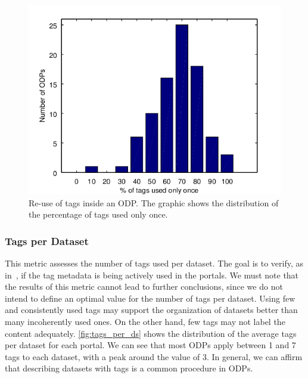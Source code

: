 
\begin{figure}[tb]
\begin{center}
\includegraphics[width=\columnwidth]{images/tag_once_dist.png}
\caption[Re-use of tags inside an ODP.]{Re-use of tags inside an ODP. The graphic shows the distribution of the percentage of tags used only once.}
\label{fig:tags_once}
\end{center}
\end{figure}

\subsubsection{Tags per Dataset}
This metric assesses the number of tags used per dataset.
The goal is to verify, as in~, if the tag metadata is being actively used in the portals.
We must note that the results of this metric cannot lead to further conclusions, since we do not intend to define an optimal value for the number of tags per dataset. 
Using few and consistently used tags may support the organization of datasets better than many incoherently used ones.
On the other hand, few tags may not label the content adequately.
\autoref{fig:tags_per_ds} shows the distribution of the average tags per dataset for each portal. 
We can see that most ODPs apply between 1 and 7 tags to each dataset, with a peak around the value of 3.
In general, we can affirm that describing datasets with tags is a common procedure in ODPs.

